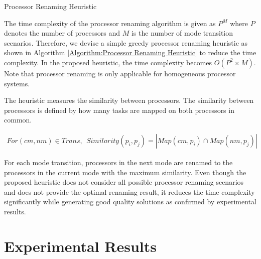 \documentclass[prodmode,acmtecs]{acmsmall}
\begin{document}
\begin{algorithm}[t]
\SetAlgoNoLine
{}
\caption{Processor Renaming Heuristic}
\label{Algorithm:Processor Renaming Heuristic}
\end{algorithm}

The time complexity of the processor renaming algorithm is given as $P^M$ where $P$ denotes the number of processors and $M$ is the number of mode transition scenarios. Therefore, we devise a simple greedy processor renaming heuristic as shown in Algorithm \ref{Algorithm:Processor Renaming Heuristic} to reduce the time complexity. In the proposed heuristic, the time complexity becomes $O(P^2 \times M)$. Note that processor renaming is only applicable for homogeneous processor systems.

The heuristic measures the similarity between processors. The similarity between processors is defined by how many tasks are mapped on both processors in common.

\begin{definition}
\label{Definition:Similarity between processors}
\begin{gather*}
For (cm, nm) \in Trans, \:\: Similarity(p_i, p_j) = |Map(cm, p_i) \cap Map(nm, p_j)|
\end{gather*}
\end{definition}

For each mode transition, processors in the next mode are renamed to the processors in the current mode with the maximum similarity. Even though the proposed heuristic does not consider all possible processor renaming scenarios and does not provide the optimal renaming result, it reduces the time complexity significantly while generating good quality solutions as confirmed by experimental results.

\section{Experimental Results}
\label{Section:Experimental Result}
\end{document}
